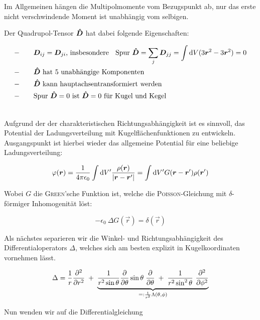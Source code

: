 Im Allgemeinen hängen die Multipolmomente vom Bezugspunkt ab, nur das erste nicht verschwindende Moment ist unabhängig vom selbigen.

Der Quadrupol-Tensor $\bm{\hat{D}}$ hat dabei folgende Eigenschaften:

\begin{align*}
- \qquad & \bm{D}_{ij} = \bm{D}_{ji}\text{, insbesondere } \; \text{ Spur } \bm{\hat{D}} = \sum_j \bm{D}_{jj} = \int\mathrm{d} V (3\bm{r}^2 - 3\bm{r}^2)=0 \\
- \qquad & \bm{\hat{D}} \text{ hat 5 unabhängige Komponenten}\\
- \qquad & \bm{\hat{D}} \text{ kann hauptachsentransformiert werden}\\
- \qquad & \text{Spur } \bm{\hat{D}} =0 \text{ ist } \bm{\hat{D}}=0 \text{ für Kugel und Kegel}
\end{align*}

\ \\

Aufgrund der der charakteristischen Richtungsabhängigkeit ist es sinnvoll, das Potential der Ladungsverteilung mit Kugelflächenfunktionen zu entwickeln. Ausgangspunkt ist hierbei wieder das allgemeine Potential für eine beliebige Ladungsverteilung: 

\begin{equation*}
\varphi(\bm{r}) = \frac{1}{4\pi\epsilon_0}\int\mathrm{d} V' \frac{\rho(\bm{r})}{|\bm{r}-\bm{r}'|} = \int\mathrm{d} V' G(\bm{r}-\bm{r}')\rho(\bm{r}')
\end{equation*}

Wobei $G$ die \textsc{Green}'sche Funktion ist, welche die \textsc{Poisson}-Gleichung mit $\delta$-förmiger Inhomogenität löst:

\begin{equation*}
-\epsilon_0 \ \Delta G(\vec{r}) = \delta(\vec{r})
\end{equation*}

Als nächstes separieren wir die Winkel- und Richtungsabhängigkeit des Differentialoperators $\Delta$, welches sich am besten explizit in Kugelkoordinaten vornehmen lässt.

\begin{equation*}
\Delta = \frac{1}{r} \pddiff{}{r}  \; +\; \underbrace{\frac{1}{r^2 \sin\theta} \pdiff{}{\theta} \sin\theta \; \pdiff{}{\theta} \; + \; \frac{1}{r^2 \sin^2\theta} \ \pddiff{}{\phi}}_{=: \frac{1}{r^2}\Lambda(\theta,\phi)}
\end{equation*}

Nun wenden wir auf die Differentialgleichung

